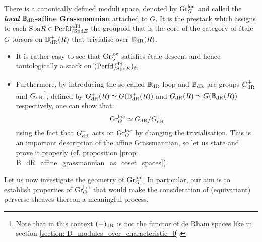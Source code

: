                 \begin{definition} \label{def: local_B_dR_affine_grassmannian}
                    There is a canonically defined moduli space, denoted by $\mathrm{Gr}_G^{\mathrm{loc}}$ and called the \textbf{\textit{local} $\mathbb{B}_{\mathrm{dR}}$-affine Grassmannian} attached to $G$. It is the prestack which assigns to each $\mathrm{Spa} R \in \mathrm{Perfd}_{/\mathrm{Spd} E}^{\mathrm{affd}}$ the groupoid that is the core of the category of \'etale $G$-torsors on $\mathbb{D}_{\mathrm{dR}}^+(R)$ that trivialise over $\mathbb{D}_{\mathrm{dR}}(R)$.  
                \end{definition}
                \begin{remark}
                    \noindent
                    \begin{itemize}
                        \item It is rather easy to see that $\mathrm{Gr}_G^{\mathrm{loc}}$ satisfies \'etale descent and hence tautologically a stack on $(\mathrm{Perfd}^{\mathrm{affd}}_{/\mathrm{Spd} E})_{\mathrm{\acute{e}t}}$.
                        \item Furthermore, by introducing the so-called $\mathbb{B}_{\mathrm{dR}}$-loop and $\mathbb{B}_{\mathrm{dR}}$-arc groups $G_{\mathrm{dR}}^+$ and $G_{\mathrm{dR}}$\footnote{Note that in this context $(-)_{\mathrm{dR}}$ is not the functor of de Rham spaces like in section \ref{section: D_modules_over_characteristic_0}.}, defined by $G_{\mathrm{dR}}^+(R) \simeq G(\mathbb{B}_{\mathrm{dR}}^+(R))$ and $G_{\mathrm{dR}}(R) \simeq G(\mathbb{B}_{\mathrm{dR}}(R))$ respectively, one can show that:
                            $$\mathrm{Gr}_G^{\mathrm{loc}} \simeq G_{\mathrm{dR}}/G_{\mathrm{dR}}^+$$
                        using the fact that $G_{\mathrm{dR}}^+$ acts on $\mathrm{Gr}_G^{\mathrm{loc}}$ by changing the trivialisation. This is an important description of the affine Grassmannian, so let us state and prove it properly (cf. proposition \ref{prop: B_dR_affine_grassmannian_as_coset_spaces}).
                    \end{itemize}
                \end{remark}
                
                Let us now investigate the geometry of $\mathrm{Gr}_G^{\mathrm{loc}}$. In particular, our aim is to establish properties of $\mathrm{Gr}_G^{\mathrm{loc}}$ that would make the consideration of (equivariant) perverse sheaves thereon a meaningful process.
                
